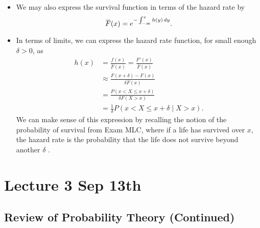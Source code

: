 \documentclass[notoc,notitlepage]{tufte-book}
\begin{document}
\begin{note}
  \begin{itemize}
    \item We may also express the survival function in terms of the hazard rate by
      \begin{equation*}
        \bar{F}(x) = e^{- \int_{-\infty}^{x} h(y) \dif{y}}.
      \end{equation*}

    \item In terms of limits, we can express the hazard rate function, for small enough $\delta > 0$, as
      \begin{align*}
        h(x) &= \frac{f(x)}{\bar{F}(x)} = \frac{F'(x)}{\bar{F}(x)} \\
             &\approx \frac{F(x + \delta) - F(x)}{\delta \bar{F}(x)} \\
             &= \frac{P(x < X \leq x + \delta)}{\delta F(X > x)} \\
             &= \frac{1}{\delta} P(x < X \leq x + \delta \mid X > x).
      \end{align*}
      We can make sense of this expression by recalling the notion of the probability of survival from Exam MLC, where if a life has survived over $x$, the hazard rate is the probability that the life does not survive beyond another $\delta$ .
  \end{itemize}
\end{note}




\chapter{Lecture 3 Sep 13th}%
\label{chp:lecture_3_sep_13th}

\section{Review of Probability Theory (Continued)}%
\label{sec:review_of_probability_theory_continued}
\end{document}
